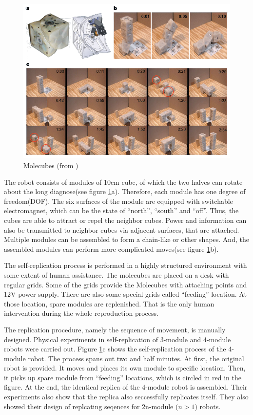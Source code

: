 \documentclass[12pt,twoside]{article}
\theoremstyle{plain}
\theoremstyle{definition}
\theoremstyle{remark}
\begin{document}
\begin{figure}[hbtp]
	 \centerline{\includegraphics[width=\textwidth]{molecubes}}
	 {\caption{Molecubes (from \cite{zykov_self-reproducing_2005})}
	 \label{fig:mole}}
\end{figure}

The robot consists of modules of 10cm cube, of which the two halves can rotate about the long diagnose(see figure \ref{fig:mole}a). Therefore, each module has one degree of freedom(DOF). The six surfaces of the module are equipped with switchable electromagnet, which can be the state of ``north'', ``south'' and ``off''. Thus, the cubes are able to attract or repel the neighbor cubes. Power and information can also be transmitted to neighbor cubes via adjacent surfaces, that are attached. Multiple modules can be assembled to form a chain-like or other shapes. And, the assembled modules can perform more complicated moves(see figure \ref{fig:mole}b). 

The self-replication process is performed in a highly structured environment with some extent of human assistance. The molecubes are placed on a desk with regular grids. Some of the grids provide the Molecubes with attaching points and 12V power supply. There are also some special grids called ``feeding'' location. At those location, spare modules are replenished. That is the only human intervention during the whole reproduction process.

The replication procedure, namely the sequence of movement, is manually designed. Physical experiments in self-replication of 3-module and 4-module robots were carried out. Figure \ref{fig:mole}c shows the self-replication process of the 4-module robot. The process spans out two and half minutes. At first, the original robot is provided. It moves and places its own module to specific location. Then, it picks up spare module from ``feeding'' locations, which is circled in red in the figure. At the end, the identical replica of the 4-module robot is assembled. Their experiments also show that the replica also seccessfully replicates itself. They also showed their design of replcating seqences for 2n-module ($n > 1$) robots. 
\end{document}
